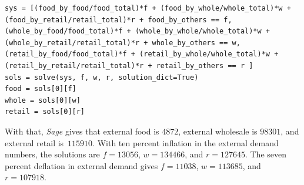 \begin{exercises}
\begin{answer}
\begin{lstlisting}
sys = [(food_by_food/food_total)*f + (food_by_whole/whole_total)*w + (food_by_retail/retail_total)*r + food_by_others == f,
(whole_by_food/food_total)*f + (whole_by_whole/whole_total)*w + (whole_by_retail/retail_total)*r + whole_by_others == w,
(retail_by_food/food_total)*f + (retail_by_whole/whole_total)*w + (retail_by_retail/retail_total)*r + retail_by_others == r ]
sols = solve(sys, f, w, r, solution_dict=True)
food = sols[0][f]
whole = sols[0][w]
retail = sols[0][r]
        \end{lstlisting}
        \begin{exparts}
          \partsitem With that, \textit{Sage} gives that
            external food is $4872$, 
            external wholesale is $98301$,
            and external retail is~$115910$.
          \partsitem With ten percent inflation in the external demand numbers,
            the solutions are
            $f=13056$, 
            $w=134466$,
            and
            $r=127645$.
          \partsitem The seven percent deflation in external demand gives 
            $f=11038$,
            $w=113685$,
            and
            $r=107918$.
        \end{exparts}
      \end{answer}
    \end{exercises}
\endinput
